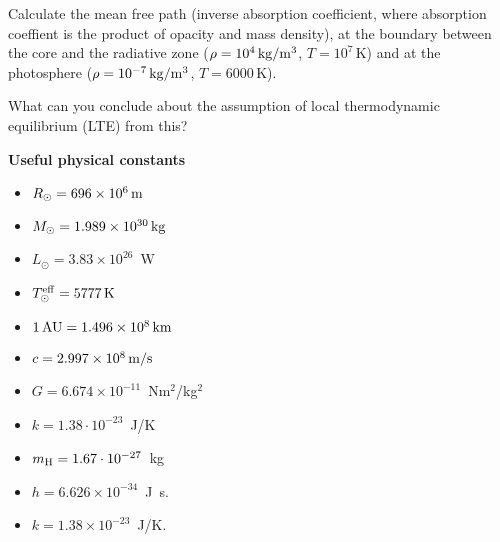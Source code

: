 \documentclass[12pt]{article}
\begin{document}
Calculate the mean free path (inverse absorption coefficient, where absorption coeffient is the product of opacity and mass density), at the boundary between the core and the radiative zone ($\rho=10^4\,{\rm kg/m^3}$, $T=10^7$\,K) and at the photosphere ($\rho=10^{-7}\,{\rm kg/m^3}$, $T=6000$\,K).

What can you conclude about the assumption of local thermodynamic equilibrium (LTE) from this?

{\bf Useful physical constants}
\begin{itemize}
  \item $R_{\odot} = 696 \times 10^6\,{\rm m}$
  \item $M_{\odot} = 1.989 \times 10^{30}\,{\rm kg}$
  \item $L_{\odot} = 3.83 \times 10^{26}$~W
  \item $T^{\rm eff}_{\odot} = 5777\,{\rm K}$
  \item $1\,{\rm AU} = 1.496 \times 10^8\,{\rm km}$
  \item $c = 2.997 \times 10^8\,{\rm m/s}$
  \item $G = 6.674 \times 10^{-11}$~Nm$^2$/kg$^2$
  \item $k = 1.38\cdot10^{-23}$~J/K
  \item $m_{\rm H} = 1.67\cdot10^{-27}$~kg
  \item $h=6.626 \times 10^{-34}$~J~s.
  \item $k=1.38 \times 10^{-23}$~J/K.
\end{itemize}
\end{document}
